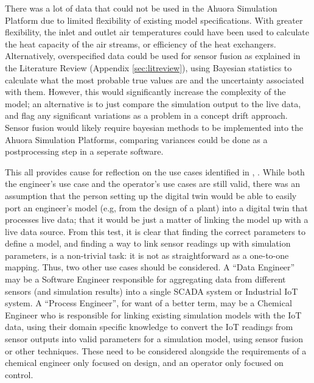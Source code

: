There was a lot of data that could not be used in the Ahuora Simulation Platform due to limited flexibility of existing model specifications. With greater flexibility, the inlet and outlet air temperatures could have been used to calculate the heat capacity of the air streams, or efficiency of the heat exchangers.
Alternatively, overspecified data could be used for sensor fusion as explained in the Literature Review (Appendix \ref{sec:litreview}), using Bayesian statistics to calculate what the most probable true values are and the uncertainty associated with them. 
However, this would significantly increase the complexity of the model; an alternative is to just compare the simulation output to the live data, and flag any significant variations as a problem in a concept drift approach. 
Sensor fusion would likely require bayesian methods to be implemented into the Ahuora Simulation Platforms, comparing variances could be done as a postprocessing step in a seperate software.

This all provides cause for reflection on the use cases identified in , . 
While both the engineer's use case and the operator's use cases are still valid, there was an assumption that the person setting up the digital twin would be able to easily port an engineer's model (e.g, from the design of a plant) into a digital twin that processes live data; that it would be just a matter of linking the model up with a live data source. 
From this test, it is clear that finding the correct parameters to define a model, and finding a way to link sensor readings up with simulation parameters, is a non-trivial task: it is not as straightforward as a one-to-one mapping. 
Thus, two other use cases should be considered. A ``Data Engineer'' may be a Software Engineer responsible for aggregating data from different sensors (and simulation results) into a single SCADA system or Industrial IoT system. 
A ``Process Engineer'', for want of a better term, may be a Chemical Engineer who is responsible for linking existing simulation models with the IoT data, using their domain specific knowledge to convert the IoT readings from sensor outputs into valid parameters for a simulation model, using sensor fusion or other techniques. 
These need to be considered alongside the requirements of a chemical engineer only focused on design, and an operator only focused on control.

